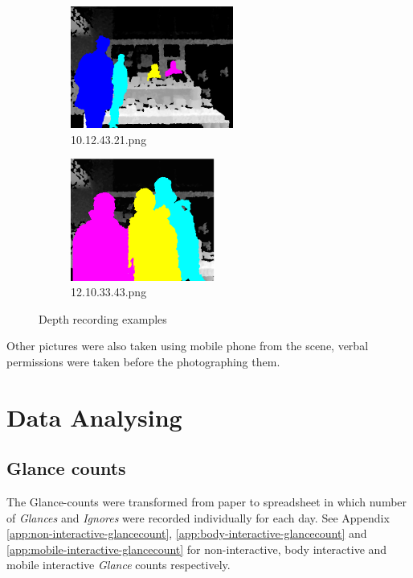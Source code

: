 \begin{enumerate}
\begin{figure}[H]
    \centering
    \begin{subfigure}[H]{0.45\textwidth}
        \centering
        \includegraphics[width=\textwidth,height=4cm]{Figures/8/d1}
        \caption{10.12.43.21.png}
        \label{fig:d1}
    \end{subfigure}
    \begin{subfigure}[H]{0.45\textwidth}
        \centering
        \includegraphics[width=\textwidth,height=4cm]{Figures/8/d2}
        \caption{12.10.33.43.png}
        \label{fig:d2}
    \end{subfigure}
    \caption{Depth recording examples}
    \label{fig:DepthRecordedImages}
\end{figure}




\end{enumerate}

Other pictures were also taken using mobile phone from the scene, verbal permissions were taken before the photographing them.


\section{Data Analysing}

\subsection {Glance counts} 
The Glance-counts were transformed from paper to spreadsheet in which number of \emph{Glances} and \emph{Ignores} were recorded individually for each day. See Appendix \ref{app:non-interactive-glancecount}, \ref{app:body-interactive-glancecount} and \ref{app:mobile-interactive-glancecount} for non-interactive, body interactive and mobile interactive \emph{Glance} counts respectively.

